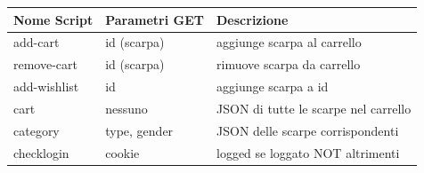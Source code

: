 \documentclass[a4paper,12pt]{article}
\begin{document}
\begin{center}
	\begin{tabular}{|l|l|l|}
		\hline
		\textbf{Nome Script}   &
		\textbf{Parametri GET} &
		\textbf{Descrizione}                                                                                           \\
		\hline
		add-cart               & id (scarpa)                                   & aggiunge scarpa al carrello           \\
		remove-cart            & id   (scarpa)                                 & rimuove scarpa da carrello            \\
		add-wishlist           & id                                            & aggiunge scarpa a id                  \\
		cart                   & nessuno                                       & JSON di tutte le scarpe nel carrello  \\
		category               & type, gender                                  & JSON delle scarpe corrispondenti      \\
		checklogin             & cookie                                        & logged se loggato NOT altrimenti      \\


\end{tabular}
\end{center}
\end{document}
